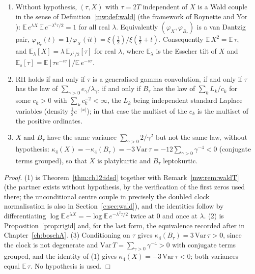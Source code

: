 \begin{theorem}\label{mqt:thm:wald}
\begin{enumerate}
\item Without hypothesis, $(\tau,X)$ with $\tau=2T$ independent of $X$ is a Wald couple in the sense of Definition~\ref{mw:def:wald} (the framework of Roynette and Yor \cite{RoynetteYor05}): $\mathbb E\,e^{\lambda X}\,\mathbb E\,e^{-\lambda^2\tau/2}=1$ for all real $\lambda$. Equivalently $(\varphi_X,\varphi_{B_\tau})$ is a van Dantzig pair, $\varphi_{B_\tau}(t)=1/\varphi_X(it)=\xi(\frac12)/\xi(\frac12+t)$. Consequently $\mathbb E\,X^2=\mathbb E\,\tau$, and $\mathbb E_\lambda[X]=\lambda\,\mathbb E_{\lambda^2/2}[\tau]$ for real $\lambda$, where $\mathbb E_\lambda$ is the Esscher tilt of $X$ and $\mathbb E_s[\tau]=\mathbb E[\tau e^{-s\tau}]/\mathbb E\,e^{-s\tau}$.
\item RH holds if and only if $\tau$ is a generalised gamma convolution, if and only if $\tau$ has the law of $\sum_{\gamma>0}e_\gamma/\lambda_\gamma$, if and only if $B_\tau$ has the law of $\sum_kL_k/c_k$ for some $c_k>0$ with $\sum_kc_k^{-2}<\infty$, the $L_k$ being independent standard Laplace variables (density $\frac12e^{-|x|}$); in that case the multiset of the $c_k$ is the multiset of the positive ordinates.
\item $X$ and $B_\tau$ have the same variance $\sum_{\gamma>0}2/\gamma^2$ but not the same law, without hypothesis: $\kappa_4(X)=-\kappa_4(B_\tau)=-3\,\mathrm{Var}\,\tau=-12\sum_{\gamma>0}\gamma^{-4}<0$ (conjugate terms grouped), so that $X$ is platykurtic and $B_\tau$ leptokurtic.
\end{enumerate}
\end{theorem}

\begin{proof}
(1) is Theorem~\ref{thm:ch12:idsd} together with Remark~\ref{mw:rem:waldT} (the partner exists without hypothesis, by the verification of the first zeros used there; the unconditional centre couple in precisely the doubled clock normalisation is also in Section~\ref{c:sec:wald}), and the identities follow by differentiating $\log\mathbb E\,e^{\lambda X}=-\log\mathbb E\,e^{-\lambda^2\tau/2}$ twice at $0$ and once at $\lambda$. (2) is Proposition~\ref{prop:rigid} and, for the last form, the equivalence recorded after \cite[Theorem~2.3]{KPS24} in Chapter~\ref{ch:boschA}. (3) Conditioning on $\tau$ gives $\kappa_4(B_\tau)=3\,\mathrm{Var}\,\tau>0$, since the clock is not degenerate and $\mathrm{Var}\,T=\sum_{\gamma>0}\gamma^{-4}>0$ with conjugate terms grouped, and the identity of (1) gives $\kappa_4(X)=-3\,\mathrm{Var}\,\tau<0$; both variances equal $\mathbb E\,\tau$. No hypothesis is used.
\end{proof}

